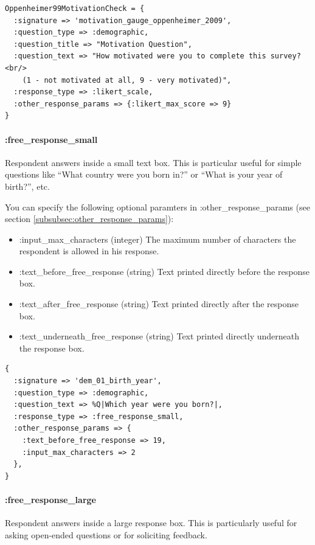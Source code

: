 \documentclass[12pt]{article}
\begin{document}
\begin{verbatim}
Oppenheimer99MotivationCheck = {
  :signature => 'motivation_gauge_oppenheimer_2009',
  :question_type => :demographic,
  :question_title => "Motivation Question",
  :question_text => "How motivated were you to complete this survey?<br/> 
    (1 - not motivated at all, 9 - very motivated)",
  :response_type => :likert_scale,
  :other_response_params => {:likert_max_score => 9}
}
\end{verbatim}

\paragraph{:free\_response\_small}

Respondent answers inside a small text box. This is particular useful for simple questions like ``What country were you born in?'' or ``What is your year of birth?'', etc.

You can specify the following optional paramters in :other\_response\_params (see section \ref{subsubsec:other_response_params}):

\begin{itemize}
\item :input\_max\_characters (integer) \quad The maximum number of characters the respondent is allowed in his response.
\item :text\_before\_free\_response (string) \quad Text printed directly before the response box.
\item :text\_after\_free\_response (string) \quad Text printed directly after the response box.
\item :text\_underneath\_free\_response (string) \quad Text printed directly underneath the response box.
\end{itemize}

\begin{verbatim}
{
  :signature => 'dem_01_birth_year',
  :question_type => :demographic,
  :question_text => %Q|Which year were you born?|,
  :response_type => :free_response_small,
  :other_response_params => {
    :text_before_free_response => 19,
    :input_max_characters => 2
  },
}
\end{verbatim}

\paragraph{:free\_response\_large}

Respondent answers inside a large response box. This is particularly useful for asking open-ended questions or for soliciting feedback.
\end{document}
